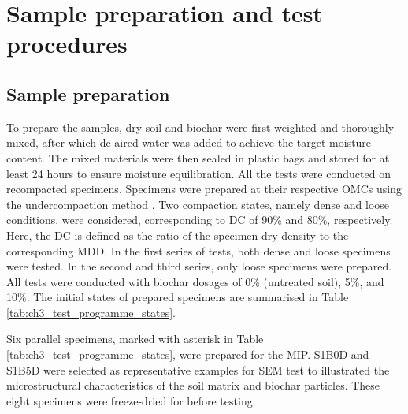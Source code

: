 \section{Sample preparation and test procedures} \label{sec:ch3testdetails}
\subsection{Sample preparation}
To prepare the samples, dry soil and biochar were first weighted and thoroughly mixed, after which de-aired water was added to achieve the target moisture content. The mixed materials were then sealed in plastic bags and stored for at least 24 hours to ensure moisture equilibration. All the tests were conducted on recompacted specimens. Specimens were prepared at their respective \acp{OMC} using the undercompaction method \parencite{laddPreparingTestSpecimens1978}. Two compaction states, namely dense and loose conditions, were considered, corresponding to \ac{DC} of 90\% and 80\%, respectively. Here, the \ac{DC} is defined as the ratio of the specimen dry density to the corresponding \ac{MDD}. In the first series of tests, both dense and loose specimens were tested. In the second and third series, only loose specimens were prepared. All tests were conducted with biochar dosages of 0\% (untreated soil), 5\%, and 10\%. The initial states of prepared specimens are summarised in Table \ref{tab:ch3_test_programme_states}.\par
Six parallel specimens, marked with asterisk in Table \ref{tab:ch3_test_programme_states}, were prepared for the \ac{MIP}. S1B0D and S1B5D were selected as representative examples for \ac{SEM} test to illustrated the microstructural characteristics of the soil matrix and biochar particles. These eight specimens were freeze-dried for before testing. \par
